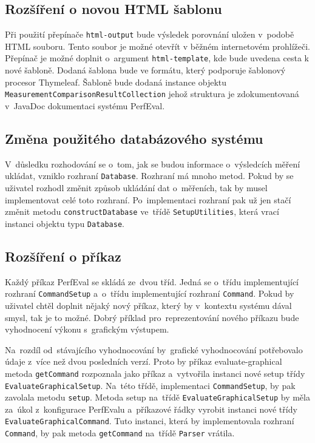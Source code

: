 \subsection{Rozšíření o novou HTML šablonu}
Při použití přepínače \lstinline{html-output} bude výsledek porovnání uložen v~podobě HTML souboru.
Tento soubor je možné otevřít v běžném internetovém prohlížeči. Přepínač je možné doplnit o~argument
\lstinline{html-template}, kde bude uvedena cesta k nové šabloně. Dodaná šablona bude
ve formátu, který podporuje šablonový procesor Thymeleaf. Šabloně bude dodaná instance objektu
\lstinline{MeasurementComparisonResultCollection} jehož struktura je zdokumentovaná v~JavaDoc
dokumentaci systému PerfEval.

\subsection{Změna použitého databázového systému}

V~důsledku rozhodování se o~tom, jak se budou informace o~výsledcích měření ukládat, vzniklo rozhraní \lstinline{Database}.
Rozhraní má mnoho metod. Pokud by se uživatel rozhodl změnit způsob ukládání dat o~měřeních, tak by
musel implementovat celé toto rozhraní. Po~implementaci rozhraní pak už jen stačí změnit metodu \lstinline{constructDatabase} ve~třídě
\lstinline{SetupUtilities}, která vrací instanci objektu typu \lstinline{Database}.

\subsection{Rozšíření o příkaz}

Každý příkaz PerfEval se skládá ze~dvou tříd. Jedná se o~třídu implementující rozhraní \lstinline{CommandSetup}
a~o~třídu implementující rozhraní \lstinline{Command}. Pokud by uživatel chtěl doplnit nějaký nový příkaz,
který by v~kontextu systému dával smysl, tak je to možné. Dobrý příklad pro~reprezentování nového příkazu
bude vyhodnocení výkonu s~grafickým výstupem.

Na~rozdíl od~stávajícího vyhodnocování by~grafické vyhodnocování potřebovalo údaje z~více než dvou posledních verzí.
Proto by příkaz evaluate-graphical metoda \lstinline{getCommand} rozpoznala jako příkaz a~vytvořila instanci nové setup třídy \lstinline{EvaluateGraphicalSetup}.
Na~této třídě, implementaci \lstinline{CommandSetup}, by pak zavolala metodu \lstinline{setup}. Metoda setup na~třídě \lstinline{EvaluateGraphicalSetup}
by měla za~úkol z~konfigurace PerfEvalu a~příkazové řádky vyrobit instanci nové třídy \lstinline{EvaluateGraphicalCommand}. Tuto instanci, která
by implementovala rozhraní \lstinline{Command}, by pak metoda \lstinline{getCommand} na~třídě \lstinline{Parser} vrátila.

